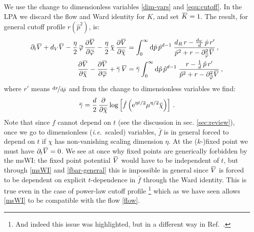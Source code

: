 \documentclass[11pt]{book}
\newcommand{\overbar}[1]{\mkern 1.5mu\overline{\mkern-1.5mu#1\mkern-1.5mu}\mkern 1.5mu}
\newcommand{\bV}{\overbar V}
\newcommand{\bK}{\overbar K}
\newcommand{\bp}{\overbar \varphi}
\newcommand{\bg}{\overbar \gamma}
\newcommand{\bc}{\overbar \chi}
\newcommand\ie{\textit{i.e.}\ }
\numberwithin{equation}{chapter}
\begin{document}
We use the change to dimensionless variables \eqref{dim-vars} and \eqref{equ:cutoff}.
In the LPA we discard the flow and Ward identity for $K$, and set $\bK=1$.
The result, for general cutoff profile $r(\hat{p}^2)$, is:
\begin{align}
  \label{flow}
  \partial_t \bV + d_V \bV - \frac{\eta}{2} \, \bp \, \frac{\partial \bV}{\partial \bp} - \frac{\eta}{2} \, \bc \, \frac{\partial \bV}{\partial \bc} &=
  \int_0^{\infty} \mathrm d\hat p \, \hat p^{d-1} \; \frac{d_R\, r - \frac{d_V}{d} \, \hat p \, r'}{\hat p^2 + r - \partial^2_{\bp}\bV}\,,\\
  \label{msWI}
  \frac{\partial \bV}{\partial \bc} - \frac{\partial \bV}{\partial \bp} + \bg \, \bV &= \bg
  \int_0^{\infty} \mathrm d\hat p \, \hat p^{d-1} \; \frac{r - \frac{1}{d} \, \hat p \, r'}{\hat p^2 + r - \partial^2_{\bp}\bV} \,,
\end{align}
where $r'$ means $\nicefrac{\mathrm dr}{\mathrm d\hat{p}}$
and from the change to dimensionless variables we find:
\begin{align}
  \label{fbar-general}
  \bg = \frac{d}{2} \, \frac{\partial}{\partial\bc} \log
  \left[
    \bar f \left({\rm e}^{\eta t/2}\mu^{\eta/2}\bc\right)
  \right]\,.
\end{align}
Note that since $f$ cannot depend on $t$ (see the discussion in sec. \ref{sec:review}),
once we go to dimensionless (\ie scaled) variables, $\bar{f}$ is in general forced to depend on
$t$ if $\chi$ has non-vanishing scaling dimension $\eta$.
At the ($k$-)fixed point we must have $\partial_t \bV = 0$. We see at once why fixed points are
generically forbidden by the msWI: the fixed point potential $\bV$ would have to be independent of $t$,
but through \eqref{msWI} and \eqref{fbar-general} this is impossible in general since $\bV$ is forced
to be dependent on explicit $t$-dependence in $\bar{f}$ through the Ward identity.
This is true even in the case of power-law cutoff profile%
\footnote{
  And indeed this issue was highlighted,
  but in a different way in Ref.~\cite{Dietz:2015owa}.
}
which as we have seen allows \eqref{msWI} to be
compatible with the flow \eqref{flow}.
\end{document}
